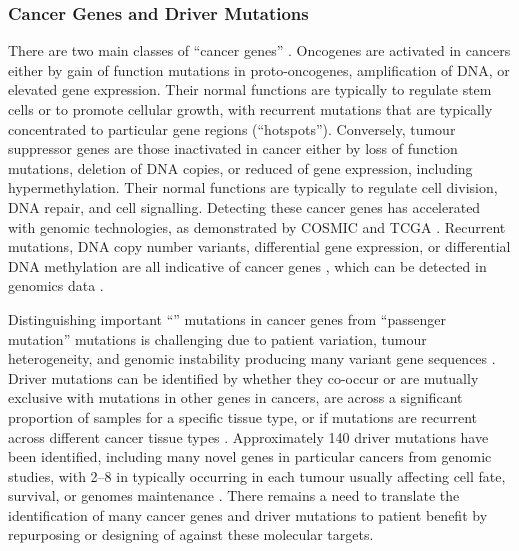 \subsubsection{Cancer Genes and Driver Mutations}
There are two main classes of ``\glspl{cancer gene}'' \citep{Futreal2001}. Oncogenes are activated in cancers either by gain of function \glspl{mutation} in proto-oncogenes, amplification of \acrshort{DNA}, or elevated \gls{gene expression}. Their normal functions are typically to regulate stem cells or to promote cellular growth, with \glspl{recurrent mutation} that are typically concentrated to particular gene regions (``hotspots''). Conversely, \gls{tumour suppressor} genes are those inactivated in cancer either by loss of function \glspl{mutation}, deletion of \acrshort{DNA} copies, or reduced of \gls{gene expression}, including hypermethylation. Their normal functions are typically to regulate cell division, \acrshort{DNA} repair, and cell signalling.
%
Detecting these \glspl{cancer gene} has accelerated with \gls{genomic} technologies, as demonstrated by \gls{COSMIC} and \gls{TCGA} \citep{COSMICdb, TCGA2013PAN}. Recurrent \glspl{mutation}, \acrshort{DNA} copy number variants, differential \gls{gene expression}, or differential \acrshort{DNA} methylation are all indicative of \glspl{cancer gene} \citep{Mattison2009}, which can be detected in \glspl{genomic} data \citep{METABRIC2016, TCGA2013PAN}. %

Distinguishing important ``'' \glspl{mutation} in \glspl{cancer gene} from ``\gls{passenger mutation}'' \glspl{mutation} is challenging due to patient variation, tumour heterogeneity, and genomic instability producing many variant gene sequences \citep{Stratton2009,  Tran2012}. Driver \glspl{mutation} can be identified by whether they co-occur or are mutually exclusive with \glspl{mutation} in other genes in cancers, are  across a significant proportion of samples for a specific tissue type, or if \glspl{mutation} are recurrent across different cancer tissue types \citep{ICGC2011, TCGA2013PAN, METABRIC2016, COSMICdb, cBioPortal}. Approximately 140 \glspl{driver mutation} have been identified, including many novel genes in particular cancers from \gls{genomic} studies, with 2--8 in typically occurring in each tumour usually affecting cell fate, survival, or \glspl{genome} maintenance \citep{Vogelstein2013}. There remains a need to translate the identification of many \glspl{cancer gene} and \glspl{driver mutation} to patient benefit  %
by repurposing or designing of  against these molecular targets.  %

